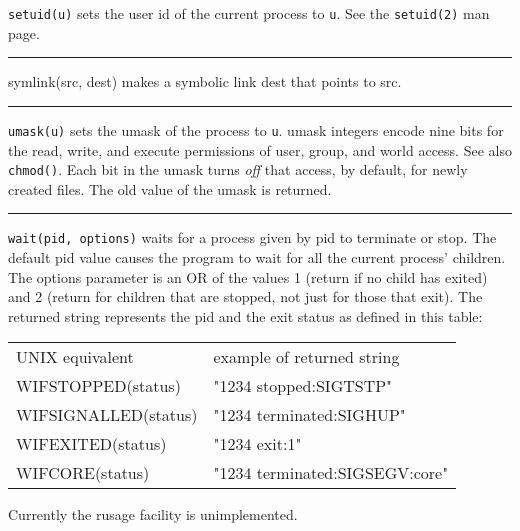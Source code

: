 \noindent
\texttt{setuid(u)} sets the user id of the current process to
\texttt{u}. See the \texttt{setuid(2)} man page. 

\bigskip\hrule\vspace{0.1cm}

\noindent
{}symlink(src, dest) makes a symbolic link dest
that points to src.

\bigskip\hrule\vspace{0.1cm}

\noindent
\texttt{umask(u)} sets the umask of the process to \texttt{u}. umask integers
encode nine bits for the read, write, and execute permissions of user,
group, and world access. See also \texttt{chmod()}. Each bit in the umask turns
\textit{off} that access, by default, for newly created files. The old
value of the umask is returned.

\bigskip\hrule\vspace{0.1cm}

\noindent
\texttt{wait(pid, options)} waits for a process given by pid to terminate or
stop. The default pid value causes the program to wait for all the
current process' children. The options parameter is an
OR of the values 1 (return if no child has exited) and 2 (return for
children that are stopped, not just for those that exit). The returned
string represents the pid and the exit status as defined in this table:

\vspace{0.05in}
\begin{center}
\begin{supertabular}{m{2.4in} m{2.6in}}
 UNIX equivalent & example of returned string \\
 WIFSTOPPED(status) & "1234 stopped:SIGTSTP" \\
 WIFSIGNALLED(status) & "1234 terminated:SIGHUP" \\
 WIFEXITED(status) & "1234 exit:1" \\
 WIFCORE(status) & "1234 terminated:SIGSEGV:core" \\
\end{supertabular}
\end{center}
\vspace{0.05in}

\noindent
Currently the \textsf{rusage} facility is unimplemented.


